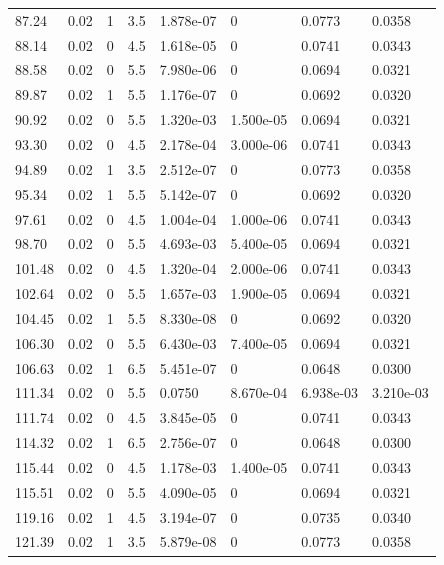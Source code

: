 \documentclass[preview]{standalone}
\begin{document}
{{{\begin{tabular}{L{1.2cm}C{1.2cm} C{0.3cm}C{0.5cm} C{1.4cm}C{1.4cm} C{1.4cm}C{1.4cm}}
  87.24  &  0.02  & 1     & 3.5 &  1.878e-07  & 0  & 0.0773 &  0.0358   \\ 
  88.14  &  0.02  & 0     & 4.5 &  1.618e-05  & 0  & 0.0741 &  0.0343   \\ 
  88.58  &  0.02  & 0     & 5.5 &  7.980e-06  & 0  & 0.0694 &  0.0321   \\ 
  89.87  &  0.02  & 1     & 5.5 &  1.176e-07  & 0  & 0.0692 &  0.0320   \\ 
  90.92  &  0.02  & 0     & 5.5 &  1.320e-03  & 1.500e-05  & 0.0694 &  0.0321   \\ 
  93.30  &  0.02  & 0     & 4.5 &  2.178e-04  & 3.000e-06  & 0.0741 &  0.0343   \\ 
  94.89  &  0.02  & 1     & 3.5 &  2.512e-07  & 0  & 0.0773 &  0.0358   \\ 
  95.34  &  0.02  & 1     & 5.5 &  5.142e-07  & 0  & 0.0692 &  0.0320   \\ 
  97.61  &  0.02  & 0     & 4.5 &  1.004e-04  & 1.000e-06  & 0.0741 &  0.0343   \\ 
  98.70  &  0.02  & 0     & 5.5 &  4.693e-03  & 5.400e-05  & 0.0694 &  0.0321   \\ 
  101.48  &  0.02  & 0     & 4.5 &  1.320e-04  & 2.000e-06  & 0.0741 &  0.0343   \\ 
  102.64  &  0.02  & 0     & 5.5 &  1.657e-03  & 1.900e-05  & 0.0694 &  0.0321   \\ 
  104.45  &  0.02  & 1     & 5.5 &  8.330e-08  & 0  & 0.0692 &  0.0320   \\ 
  106.30  &  0.02  & 0     & 5.5 &  6.430e-03  & 7.400e-05  & 0.0694 &  0.0321   \\ 
  106.63  &  0.02  & 1     & 6.5 &  5.451e-07  & 0  & 0.0648 &  0.0300   \\ 
  111.34  &  0.02  & 0     & 5.5 &  0.0750  & 8.670e-04  & 6.938e-03 &  3.210e-03   \\ 
  111.74  &  0.02  & 0     & 4.5 &  3.845e-05  & 0  & 0.0741 &  0.0343   \\ 
  114.32  &  0.02  & 1     & 6.5 &  2.756e-07  & 0  & 0.0648 &  0.0300   \\ 
  115.44  &  0.02  & 0     & 4.5 &  1.178e-03  & 1.400e-05  & 0.0741 &  0.0343   \\ 
  115.51  &  0.02  & 0     & 5.5 &  4.090e-05  & 0  & 0.0694 &  0.0321   \\ 
  119.16  &  0.02  & 1     & 4.5 &  3.194e-07  & 0  & 0.0735 &  0.0340   \\ 
  121.39  &  0.02  & 1     & 3.5 &  5.879e-08  & 0  & 0.0773 &  0.0358   \\ 

\end{tabular}}}}
\end{document}

